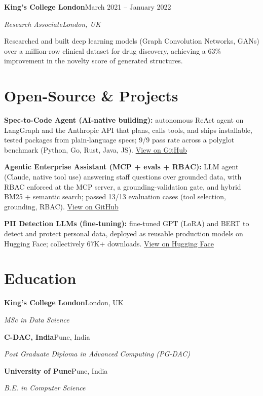 \documentclass[10pt,a4paper]{article}
\newcommand{\entry}[4]{%
  {\color{company}\bfseries #1}\hfill {\color{muted}#2}\par
  \vspace{1pt}
  {\itshape #3}\hfill {\color{muted}\itshape #4}\par
  \vspace{3pt}%
}
\begin{document}
\entry{King's College London}{March 2021 -- January 2022}{Research Associate}{London, UK}
\begin{tight}
  \item Researched and built deep learning models (Graph Convolution Networks, GANs) over a million-row clinical dataset for drug discovery, achieving a 63\% improvement in the novelty score of generated structures.
\end{tight}

\section{Open-Source \& Projects}
\begin{tight}
  \item \textbf{Spec-to-Code Agent (AI-native building):} autonomous ReAct agent on LangGraph and the Anthropic API that plans, calls tools, and ships installable, tested packages from plain-language specs; 9/9 pass rate across a polyglot benchmark (Python, Go, Rust, Java, JS). \href{https://github.com/abhijeetscode/Spec-to-Code-Agent}{View on GitHub}
  \item \textbf{Agentic Enterprise Assistant (MCP + evals + RBAC):} LLM agent (Claude, native tool use) answering staff questions over grounded data, with RBAC enforced at the MCP server, a grounding-validation gate, and hybrid BM25 + semantic search; passed 13/13 evaluation cases (tool selection, grounding, RBAC). \href{https://github.com/abhijeetscode/Agentic-Enterprise-Assistant}{View on GitHub}
  \item \textbf{PII Detection LLMs (fine-tuning):} fine-tuned GPT (LoRA) and BERT to detect and protect personal data, deployed as reusable production models on Hugging Face; collectively 67K+ downloads. \href{https://huggingface.co/ab-ai/pii_model}{View on Hugging Face}
\end{tight}

\section{Education}
{\color{company}\bfseries King's College London}\hfill {\color{muted}London, UK}\par
{\itshape MSc in Data Science}\par\vspace{2pt}
{\color{company}\bfseries C-DAC, India}\hfill {\color{muted}Pune, India}\par
{\itshape Post Graduate Diploma in Advanced Computing (PG-DAC)}\par\vspace{2pt}
{\color{company}\bfseries University of Pune}\hfill {\color{muted}Pune, India}\par
{\itshape B.E. in Computer Science}\par
\end{document}
